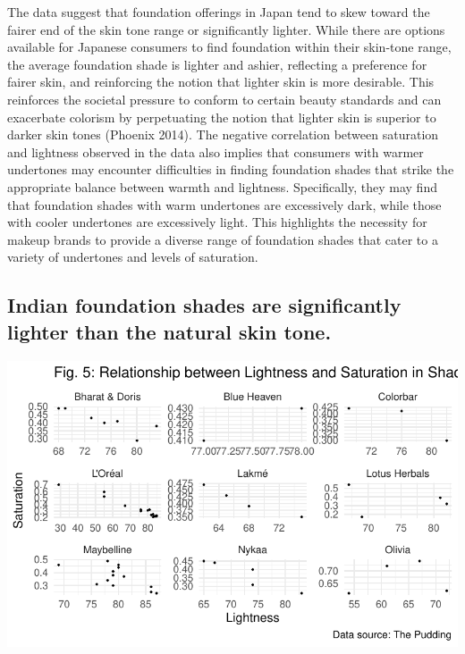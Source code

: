 \documentclass[
  letterpaper,
  DIV=11,
  numbers=noendperiod]{scrartcl}
\begin{document}
The data suggest that foundation offerings in Japan tend to skew toward
the fairer end of the skin tone range or significantly lighter. While
there are options available for Japanese consumers to find foundation
within their skin-tone range, the average foundation shade is lighter
and ashier, reflecting a preference for fairer skin, and reinforcing the
notion that lighter skin is more desirable. This reinforces the societal
pressure to conform to certain beauty standards and can exacerbate
colorism by perpetuating the notion that lighter skin is superior to
darker skin tones (Phoenix 2014). The negative correlation between
saturation and lightness observed in the data also implies that
consumers with warmer undertones may encounter difficulties in finding
foundation shades that strike the appropriate balance between warmth and
lightness. Specifically, they may find that foundation shades with warm
undertones are excessively dark, while those with cooler undertones are
excessively light. This highlights the necessity for makeup brands to
provide a diverse range of foundation shades that cater to a variety of
undertones and levels of saturation.

\newpage

\hypertarget{indian-foundation-shades-are-significantly-lighter-than-the-natural-skin-tone.}{%
\subsection{Indian foundation shades are significantly lighter than the
natural skin
tone.}\label{indian-foundation-shades-are-significantly-lighter-than-the-natural-skin-tone.}}

\includegraphics{paper_files/figure-pdf/unnamed-chunk-8-1.pdf}
\end{document}
